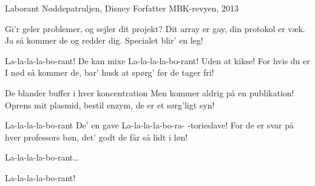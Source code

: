 \begin{song}{Laborant}
  {} %
  {Nøddepatruljen, Disney} %
  {Forfatter} %
  {MBK-revyen, 2013} %
  {\NotCCLIed} %

  \begin{SBVerse}
    Gi'r geler problemer,
    og sejler dit projekt?
    Dit array er gay,
    din protokol er væk.
    Ja så kommer de og redder dig.
    Specialet blir' en leg!
  \end{SBVerse}

  \begin{SBChorus}
    La-la-la-la-bo-rant!
    De kan mixe
    La-la-la-la-bo-rant!
    Uden at kikse!
    For hvis du er I nød så kommer de,
    bar' husk at spørg' før de tager fri!
  \end{SBChorus}

  \begin{SBVerse}
    De blander buffer
    i hver koncentration
    Men kommer aldrig
    på en publikation!
    Oprens mit plasmid, bestil enzym,
    de er et sørg'ligt syn!
  \end{SBVerse}

  \begin{SBChorus}
    La-la-la-la-bo-rant
    De' en gave
    La-la-la-la-bo-ra-
    -torieslave!
    For de er svar på hver professors bøn,
    det' godt de får så lidt i løn!
  \end{SBChorus}

  \begin{SBChorus}
    La-la-la-la-bo-rant\ldots
  \end{SBChorus}

  \begin{SBSection*}
    La-la-la-la-bo-rant!
  \end{SBSection*}
\end{song}